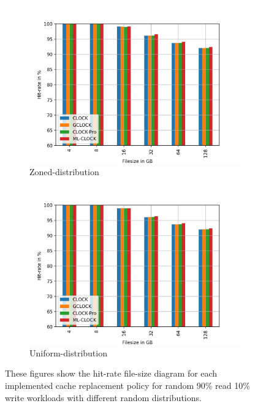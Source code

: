\documentclass[
	12pt,
	a4paper,
	abstract,
	bibliography=totoc,
	chapterprefix,
	headings=openright,
	numbers=endperiod,
	parskip=half,
	twoside,
]{scrreprt}
\begin{document}
\begin{figure}
\begin{subfigure}{0.4\textwidth}
		\includegraphics[width=\textwidth]{rw_90to10_zoned.jpg}		
		\caption{Zoned-distribution}
		\label{fig:rw_90to10  zoned}
	\end{subfigure}
	\hfill
	\begin{subfigure}{0.4\textwidth}
		\includegraphics[width=\textwidth]{rw_90to10_uniform.jpg}		
		\caption{Uniform-distribution}
		\label{fig:rw_90to10  uniform}
	\end{subfigure}
	\caption{These figures show the hit-rate file-size diagram for each implemented 		cache replacement policy for random 90\% read 10\% write workloads with different random distributions.}
\end{figure}

\end{document}

